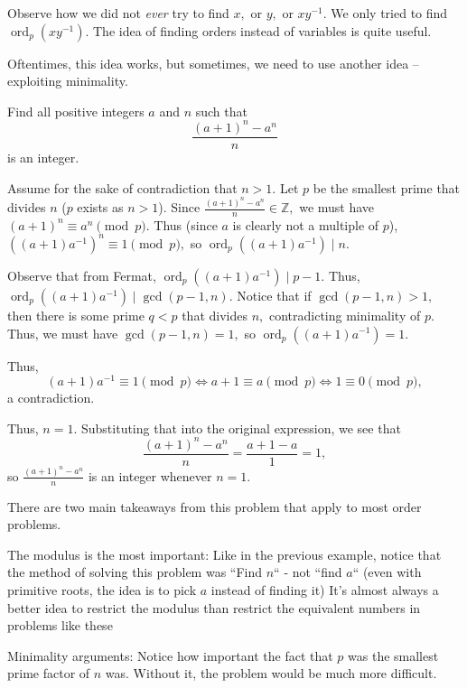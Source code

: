 \documentclass{article}
\begin{document}
Observe how we did not \emph{ever} try to find $x,$ or $y,$ or $xy^{-1}.$ We only tried to find $\operatorname{ord}_p(xy^{-1}).$ The idea of finding orders instead of variables is quite useful.

Oftentimes, this idea works, but sometimes, we need to use another idea -- exploiting minimality.

\begin{exam}
Find all positive integers $a$ and $n$ such that $$\frac{(a+1)^n - a^n}{n}$$ is an integer.
\end{exam}

\begin{sol}
Assume for the sake of contradiction that $n>1.$ Let $p$ be the smallest prime that divides $n$ ($p$ exists as $n>1$). Since $\frac{(a+1)^n - a^n}{n} \in \mathbb{Z},$ we must have $(a+1)^{n} \equiv a^{n} \pmod{p}.$ Thus (since $a$ is clearly not a multiple of $p$), $((a+1)a^{-1})^{n} \equiv 1 \pmod{p},$ so $\operatorname{ord}_p((a+1)a^{-1}) \mid n.$

Observe that from Fermat, $\operatorname{ord}_p((a+1)a^{-1}) \mid p-1.$ Thus, $\operatorname{ord}_p((a+1)a^{-1}) \mid \gcd(p-1, n).$ Notice that if $\gcd(p-1, n) > 1,$ then there is some prime $q < p$ that divides $n,$ contradicting minimality of $p.$ Thus, we must have $\gcd(p-1, n) = 1,$ so $\operatorname{ord}_p((a+1)a^{-1}) = 1.$

Thus, $$(a+1)a^{-1} \equiv 1 \pmod{p} \Longleftrightarrow a+1 \equiv a \pmod{p} \Longleftrightarrow 1 \equiv 0 \pmod{p},$$ a contradiction.

Thus, $n = 1.$ Substituting that into the original expression, we see that $$\frac{(a+1)^n-a^n}{n} = \frac{a+1-a}{1} = 1,$$ so $\frac{(a+1)^n-a^n}{n}$ is an integer whenever $n = 1.$
\end{sol}

There are two main takeaways from this problem that apply to most order problems.

\begin{itemize}
\Item The modulus is the most important: Like in the previous example, notice that the method of solving this problem was ``Find $n$`` - not ``find $a$`` (even with primitive roots, the idea is to pick $a$ instead of finding it) It's almost always a better idea to restrict the modulus than restrict the equivalent numbers in problems like these

\Item Minimality arguments: Notice how important the fact that $p$ was the smallest prime factor of $n$ was. Without it, the problem would be much more difficult.
\end{itemize}
\end{document}
